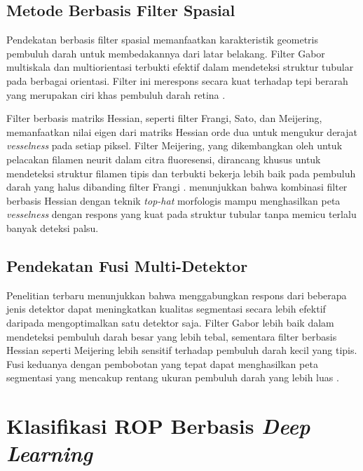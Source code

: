 \subsection{Metode Berbasis Filter Spasial}

Pendekatan berbasis filter spasial memanfaatkan karakteristik geometris pembuluh darah untuk
membedakannya dari latar belakang. Filter Gabor multiskala dan multiorientasi terbukti efektif
dalam mendeteksi struktur tubular pada berbagai orientasi. Filter ini merespons secara kuat
terhadap tepi berarah yang merupakan ciri khas pembuluh darah retina \citep{Khandouzi2022}.

Filter berbasis matriks Hessian, seperti filter Frangi, Sato, dan Meijering, memanfaatkan
nilai eigen dari matriks Hessian orde dua untuk mengukur derajat \textit{vesselness} pada
setiap piksel. Filter Meijering, yang dikembangkan oleh \citet{Meijering2004} untuk pelacakan
filamen neurit dalam citra fluoresensi, dirancang khusus untuk mendeteksi struktur filamen tipis
dan terbukti bekerja lebih baik pada pembuluh darah yang halus dibanding filter Frangi
\citep{Tian2021}. \citet{Almeida2024} menunjukkan bahwa kombinasi filter berbasis Hessian
dengan teknik \textit{top-hat} morfologis mampu menghasilkan peta \textit{vesselness} dengan
respons yang kuat pada struktur tubular tanpa memicu terlalu banyak deteksi palsu.

\subsection{Pendekatan Fusi Multi-Detektor}

Penelitian terbaru menunjukkan bahwa menggabungkan respons dari beberapa jenis detektor dapat
meningkatkan kualitas segmentasi secara lebih efektif daripada mengoptimalkan satu detektor
saja. Filter Gabor lebih baik dalam mendeteksi pembuluh darah besar yang lebih tebal, sementara
filter berbasis Hessian seperti Meijering lebih sensitif terhadap pembuluh darah kecil yang
tipis. Fusi keduanya dengan pembobotan yang tepat dapat menghasilkan peta segmentasi yang
mencakup rentang ukuran pembuluh darah yang lebih luas \citep{Almeida2024}.

\section{Klasifikasi ROP Berbasis \textit{Deep Learning}}

